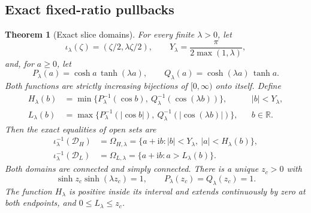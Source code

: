 \documentclass[11pt]{article}
\numberwithin{equation}{section}
\newtheorem{theorem}{Theorem}[section]
\theoremstyle{definition}
\newcommand{\R}{\mathbb R}
\newcommand{\ii}{\mathrm i}
\renewcommand{\DH}{\mathcal D_H}
\newcommand{\DL}{\mathcal D_L}
\begin{document}
\subsection{Exact fixed-ratio pullbacks}
\label{geo:slices-section}

\begin{theorem}[Exact slice domains]\label{geo:exact-pullbacks}
For every finite \(\lambda>0\), let
\[
 \iota_\lambda(\zeta)=(\zeta/2,\lambda\zeta/2),\qquad
 Y_\lambda=\frac{\pi}{2\max(1,\lambda)},
\]
and, for \(a\geq0\), let
\[
 P_\lambda(a)=\cosh a\,\tanh(\lambda a),\qquad
 Q_\lambda(a)=\cosh(\lambda a)\,\tanh a.
\]
Both functions are strictly increasing bijections of
\([0,\infty)\) onto itself.  Define
\begin{align*}
 H_\lambda(b)&=\min\{
  P_\lambda^{-1}(\cos b),\
  Q_\lambda^{-1}(\cos(\lambda b))\},
       &&|b|<Y_\lambda,\\
 L_\lambda(b)&=\max\{
  P_\lambda^{-1}(|\cos b|),\
  Q_\lambda^{-1}(|\cos(\lambda b)|)\},
       &&b\in\R.
\end{align*}
Then the exact equalities of open sets are
\begin{align}
 \iota_\lambda^{-1}(\DH)
 &=\Omega_{H,\lambda}
   =\{a+\ii b:|b|<Y_\lambda,\ |a|<H_\lambda(b)\},
                         \label{geo:HT-pullback}\\
 \iota_\lambda^{-1}(\DL)
 &=\Omega_{L,\lambda}
   =\{a+\ii b:a>L_\lambda(b)\}.
                         \label{geo:LT-pullback}
\end{align}
Both domains are connected and simply connected.
There is a unique \(z_c>0\) with
\[
 \sinh z_c\sinh(\lambda z_c)=1,\qquad
 P_\lambda(z_c)=Q_\lambda(z_c)=1.
\]
The function \(H_\lambda\) is positive inside its interval
and extends continuously by zero at both endpoints,
and \(0\leq L_\lambda\leq z_c\).
\end{theorem}
\end{document}
